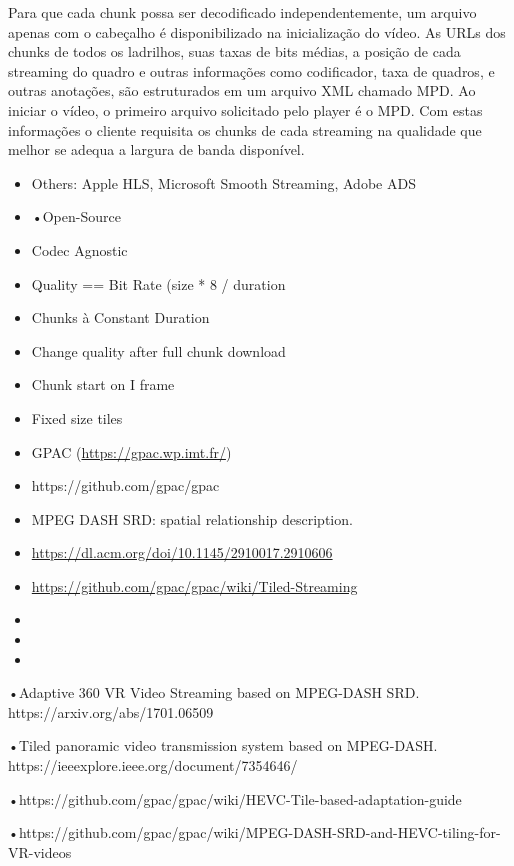 Para que cada chunk possa ser decodificado independentemente, um arquivo apenas com o cabeçalho é disponibilizado na inicialização do vídeo. As URLs dos chunks de todos os ladrilhos, suas taxas de bits médias, a posição de cada streaming do quadro e outras informações como codificador, taxa de quadros, e outras anotações, são estruturados em um arquivo XML chamado MPD. Ao iniciar o vídeo, o primeiro arquivo solicitado pelo player é o MPD. Com estas informações o cliente requisita os chunks de cada streaming na qualidade que melhor se adequa a largura de banda disponível.

\begin{itemize}
       \item Others: Apple HLS, Microsoft Smooth Streaming, Adobe ADS
       \item •Open-Source
       \item Codec Agnostic
       \item Quality == Bit Rate (size * 8 / duration
       \item Chunks à Constant Duration
       \item Change quality after full chunk download
       \item Chunk start on I frame
       \item Fixed size tiles
       \item GPAC (\url{https://gpac.wp.imt.fr/})
       \item https://github.com/gpac/gpac
       \item MPEG DASH SRD: spatial relationship description.
       \item \url{https://dl.acm.org/doi/10.1145/2910017.2910606}
       \item \url{https://github.com/gpac/gpac/wiki/Tiled-Streaming}
       \item
       \item
       \item


\end{itemize}


•Adaptive 360 VR Video Streaming based on MPEG-DASH SRD. https://arxiv.org/abs/1701.06509

•Tiled panoramic video transmission system based on MPEG-DASH. https://ieeexplore.ieee.org/document/7354646/

•https://github.com/gpac/gpac/wiki/HEVC-Tile-based-adaptation-guide

•https://github.com/gpac/gpac/wiki/MPEG-DASH-SRD-and-HEVC-tiling-for-VR-videos


